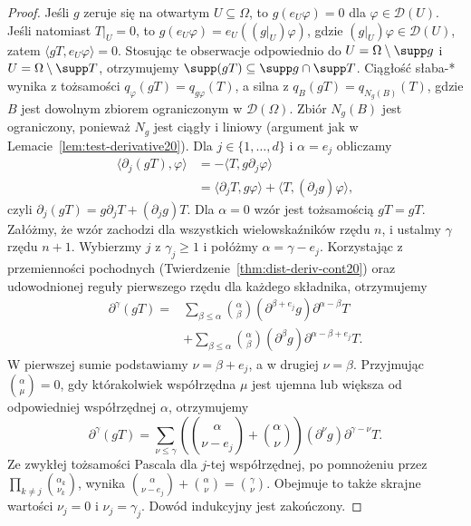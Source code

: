 \begin{proof}
Jeśli $g$ zeruje się na otwartym $U\subseteq\Omega$, to
$g(e_U\varphi)=0$ dla $\varphi\in\mathcal D(U)$.
Jeśli natomiast $T|_U=0$, to
$g(e_U\varphi)=e_U((g|_U)\varphi)$, gdzie
$(g|_U)\varphi\in\mathcal D(U)$, zatem
$\langle gT,e_U\varphi\rangle=0$.
Stosując te obserwacje odpowiednio do
$U=\Omega\setminus\supp g$ i $U=\Omega\setminus\supp T$,
otrzymujemy $\supp(gT)\subseteq\supp g\cap\supp T$.
Ciągłość słaba-* wynika z tożsamości
$q_\varphi(gT)=q_{g\varphi}(T)$, a silna z
$q_B(gT)=q_{N_g(B)}(T)$, gdzie $B$ jest dowolnym zbiorem
ograniczonym w $\mathcal D(\Omega)$.
Zbiór $N_g(B)$ jest ograniczony, ponieważ $N_g$ jest
ciągły i liniowy (argument jak w Lemacie~\ref{lem:test-derivative20}).
Dla $j\in\{1,\ldots,d\}$ i $\alpha=e_j$ obliczamy
\[
 \begin{aligned}
 \langle\partial_j(gT),\varphi\rangle
 &=-\langle T,g\partial_j\varphi\rangle\\
 &=\langle\partial_jT,g\varphi\rangle
   +\langle T,(\partial_jg)\varphi\rangle,
 \end{aligned}
\]
czyli $\partial_j(gT)=g\partial_jT+(\partial_jg)T$.
Dla $\alpha=0$ wzór jest tożsamością $gT=gT$.
Załóżmy, że wzór zachodzi dla wszystkich wielowskaźników
rzędu $n$, i ustalmy $\gamma$ rzędu $n+1$.
Wybierzmy $j$ z $\gamma_j\ge1$ i połóżmy $\alpha=\gamma-e_j$.
Korzystając z przemienności pochodnych
(Twierdzenie~\ref{thm:dist-deriv-cont20}) oraz udowodnionej
reguły pierwszego rzędu dla każdego składnika, otrzymujemy
\[
\begin{aligned}
\partial^\gamma(gT)
={}&\sum_{\beta\le\alpha}\binom\alpha\beta
(\partial^{\beta+e_j}g)\partial^{\alpha-\beta}T\\
&+\sum_{\beta\le\alpha}\binom\alpha\beta
(\partial^\beta g)\partial^{\alpha-\beta+e_j}T.
\end{aligned}
\]
W pierwszej sumie podstawiamy $\nu=\beta+e_j$, a w drugiej
$\nu=\beta$. Przyjmując $\binom\alpha\mu=0$, gdy którakolwiek
współrzędna $\mu$ jest ujemna lub większa od odpowiedniej
współrzędnej $\alpha$, otrzymujemy
\[
\partial^\gamma(gT)=\sum_{\nu\le\gamma}
\left(\binom\alpha{\nu-e_j}+\binom\alpha\nu\right)
(\partial^\nu g)\partial^{\gamma-\nu}T.
\]
Ze zwykłej tożsamości Pascala dla $j$-tej współrzędnej,
po pomnożeniu przez $\prod_{k\ne j}\binom{\alpha_k}{\nu_k}$,
wynika $\binom\alpha{\nu-e_j}+\binom\alpha\nu=\binom\gamma\nu$.
Obejmuje to także skrajne wartości $\nu_j=0$ i $\nu_j=\gamma_j$.
Dowód indukcyjny jest zakończony.
\end{proof}

